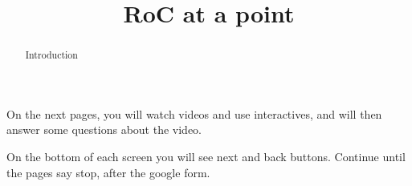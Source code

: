 \documentclass[handout]{ximera}
\title{RoC at a point}
\begin{document}
\begin{abstract} Introduction %
\end{abstract}


\maketitle

On the next pages, you will watch videos and use interactives, and will then answer some questions about the video.

On the bottom of each screen you will see next and back buttons. Continue until the pages say stop, after the google form.
\end{document}
